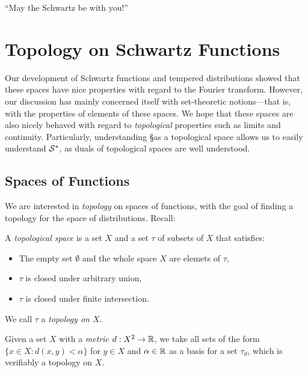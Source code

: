 
  \begin{savequote}
    ``May the Schwartz be with you!''
  \end{savequote}
  \chapter{Topology on Schwartz Functions}
    \label{ch:topons}
    Our development of Schwartz functions and tempered distributions showed that these spaces have nice properties with regard to the Fourier transform.
    However, our discussion has mainly concerned itself with set-theoretic notions---that is, with the properties of elements of these spaces.
    We hope that these spaces are also nicely behaved with regard to \emph{topological} properties such as limits and continuity.
    Particularly, understanding \S as a topological space allows us to easily understand $\S^*$, as duals of topological spaces are well understood.

    \section{Spaces of Functions}
      We are interested in \emph{topology} on spaces of functions, with the goal of finding a topology for the space of distributions.
      Recall:
      \begin{defn}
        A \emph{topological space} is a set $X$ and a set $\tau$ of subsets of $X$ that satisfies:
        \begin{itemize}
          \item The empty set $\emptyset$ and the whole space $X$ are elemets of $\tau$,
          \item $\tau$ is closed under arbitrary union,
          \item $\tau$ is closed under finite intersection.
        \end{itemize}
        We call $\tau$ a \emph{topology on $X$}.

        Given a set $X$ with a \emph{metric} $d:X^2\rightarrow\R$, we take all sets of the form $\{x\in X:d(x,y)<\alpha\}$ for $y\in X$ and $\alpha\in\R$ as a basis for a set $\tau_d$, which is verifiably a topology on $X$.
      \end{defn}


